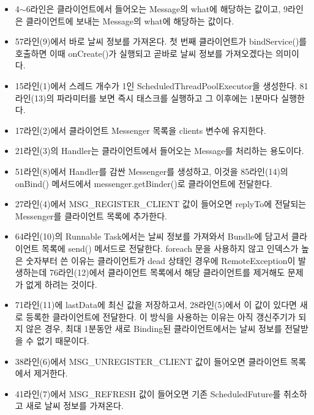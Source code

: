 \begin{itemize}
\item 4$\sim$6라인은 클라이언트에서 들어오는 Message의 what에 해당하는 값이고, 9라인은 클라이언트에 보내는 Message의 what에 해당하는 값이다.

\item 57라인(9)에서 바로 날씨 정보를 가져온다. 첫 번째 클라이언트가 bindService()를 호출하면 이때 onCreate()가 실행되고 곧바로 날씨 정보를 가져오겠다는 의미이다.

\item 15라인(1)에서 스레드 개수가 1인 ScheduledThreadPoolExecutor을 생성한다. 81라인(13)의 파라미터를 보면 즉시 태스크를 실행하고 그 이후에는 1분마다 실행한다.

\item 17라인(2)에서 클라이언트 Messenger 목록을 clients 변수에 유지한다.

\item 21라인(3)의 Handler는 클라이언트에서 들어오는 Message를 처리하는 용도이다.

\item 51라인(8)에서 Handler를 감싼 Messenger를 생성하고, 이것을 85라인(14)의 onBind() 메서드에서 messenger.getBinder()로 클라이언트에 전달한다.

\item 27라인(4)에서 MSG\_REGISTER\_CLIENT 값이 들어오면 replyTo에 전달되는 Messenger를 클라이언트 목록에 추가한다.

\item 64라인(10)의 Runnable Task에서는 날씨 정보를 가져와서 Bundle에 담고서 클라이언트 목록에 send() 메서드로 전달한다. foreach 문을 사용하지 않고 인덱스가 높은 숫자부터 쓴 이유는 클라이언트가 dead 상태인 경우에 RemoteException이 발생하는데 76라인(12)에서 클라이언트 목록에서 해당 클라이언트를 제거해도 문제가 없게 하려는 것이다.

\item 71라인(11)에 lastData에 최신 값을 저장하고서, 28라인(5)에서 이 값이 있다면 새로 등록한 클라이언트에 전달한다. 이 방식을 사용하는 이유는 아직 갱신주기가 되지 않은 경우, 최대 1분동안 새로 Binding된 클라이언트에서는 날씨 정보를 전달받을 수 없기 때문이다.

\item 38라인(6)에서 MSG\_UNREGISTER\_CLIENT 값이 들어오면 클라이언트 목록에서 제거한다.

\item 41라인(7)에서 MSG\_REFRESH 값이 들어오면 기존 ScheduledFuture를 취소하고 새로 날씨 정보를 가져온다.
\end{itemize}

